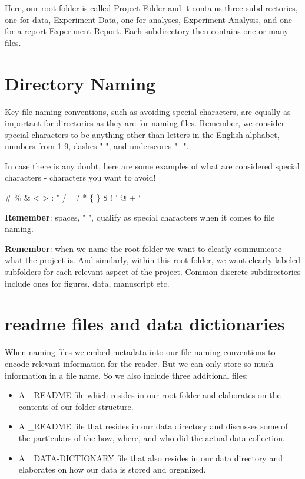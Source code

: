 \documentclass[
]{book}
\providecommand{\tightlist}{%
  \setlength{\itemsep}{0pt}\setlength{\parskip}{0pt}}
\begin{document}
Here, our root folder is called Project-Folder and it contains three subdirectories, one for data, Experiment-Data, one for analyses, Experiment-Analysis, and one for a report Experiment-Report. Each subdirectory then contains one or many files.

\hypertarget{directory-naming}{%
\section{Directory Naming}\label{directory-naming}}

Key file naming conventions, such as avoiding special characters, are equally as important for directories as they are for naming files. Remember, we consider special characters to be anything other than letters in the English alphabet, numbers from 1-9, dashes "-", and underscores "\_".

In case there is any doubt, here are some examples of what are considered special characters - characters you want to avoid!

\# \% \& \textless{} \textgreater{} : " / ~\textbar{} ? * \{ \} \$ ! ' @ + ` =

\textbf{Remember}: spaces, " ", qualify as special characters when it comes to file naming.

\textbf{Remember}: when we name the root folder we want to clearly communicate what the project is. And similarly, within this root folder, we want clearly labeled subfolders for each relevant aspect of the project. Common discrete subdirectories include ones for figures, data, manuscript etc.

\hypertarget{readme-files-and-data-dictionaries}{%
\section{readme files and data dictionaries}\label{readme-files-and-data-dictionaries}}

When naming files we embed metadata into our file naming conventions to encode relevant information for the reader. But we can only store so much information in a file name. So we also include three additional files:

\begin{itemize}
\tightlist
\item
  A \_README file which resides in our root folder and elaborates on the contents of our folder structure.
\item
  A \_README file that resides in our data directory and discusses some of the particulars of the how, where, and who did the actual data collection.
\item
  A \_DATA-DICTIONARY file that also resides in our data directory and elaborates on how our data is stored and organized.
\end{itemize}
\end{document}

